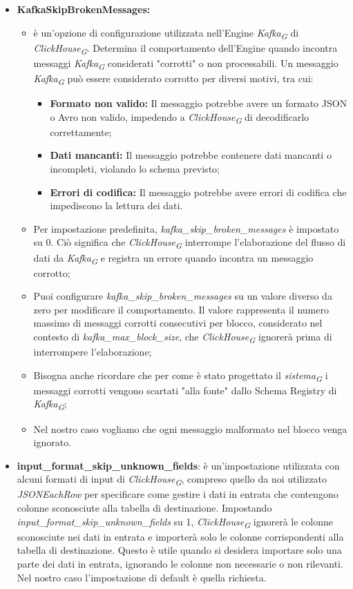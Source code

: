 \begin{itemize}
\item \textbf{KafkaSkipBrokenMessages:}
\begin{itemize}
	\item è un'opzione di configurazione utilizzata nell'Engine \textit{Kafka}\textsubscript{\textit{G}} di \textit{ClickHouse}\textsubscript{\textit{G}}. Determina il comportamento dell'Engine quando incontra messaggi \textit{Kafka}\textsubscript{\textit{G}} considerati "corrotti" o non processabili.
	Un messaggio \textit{Kafka}\textsubscript{\textit{G}} può essere considerato corrotto per diversi motivi, tra cui:
	\begin{itemize}
		\item \textbf{Formato non valido:} Il messaggio potrebbe avere un formato JSON o Avro non valido, impedendo a \textit{ClickHouse}\textsubscript{\textit{G}} di decodificarlo correttamente;
		\item \textbf{Dati mancanti:} Il messaggio potrebbe contenere dati mancanti o incompleti, violando lo schema previsto;
		\item \textbf{Errori di codifica:} Il messaggio potrebbe avere errori di codifica che impediscono la lettura dei dati.
	\end{itemize}
	\item Per impostazione predefinita, \textit{kafka\_skip\_broken\_messages} è impostato su 0. Ciò significa che \textit{ClickHouse}\textsubscript{\textit{G}} interrompe l'elaborazione del flusso di dati da \textit{Kafka}\textsubscript{\textit{G}} e registra un errore quando incontra un messaggio corrotto;
	\item Puoi configurare \textit{kafka\_skip\_broken\_messages} su un valore diverso da zero per modificare il comportamento. Il valore rappresenta il numero massimo di messaggi corrotti consecutivi per blocco, considerato nel contesto di  \textit{kafka\_max\_block\_size}, che \textit{ClickHouse}\textsubscript{\textit{G}} ignorerà prima di interrompere l'elaborazione;
	\item Bisogna anche ricordare che per come è stato progettato il \textit{sistema}\textsubscript{\textit{G}} i messaggi corrotti vengono scartati "alla fonte" dallo Schema Registry di \textit{Kafka}\textsubscript{\textit{G}};
	\item Nel nostro caso vogliamo che ogni messaggio malformato nel blocco venga ignorato.
\end{itemize}
\item \textbf{input\_format\_skip\_unknown\_fields}:  è un'impostazione utilizzata con alcuni formati di input di \textit{ClickHouse}\textsubscript{\textit{G}}, compreso quello da noi utilizzato \textit{JSONEachRow} per specificare come gestire i dati in entrata che contengono colonne sconosciute alla tabella di destinazione. Impostando \textit{input\_format\_skip\_unknown\_fields} su 1, \textit{ClickHouse}\textsubscript{\textit{G}} ignorerà le colonne sconosciute nei dati in entrata e importerà solo le colonne corrispondenti alla tabella di destinazione. Questo è utile quando si desidera importare solo una parte dei dati in entrata, ignorando le colonne non necessarie o non rilevanti.
Nel nostro caso l'impostazione di default è quella richiesta.
\end{itemize}


